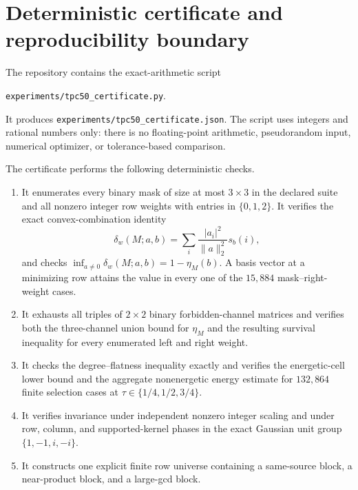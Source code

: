 \section{Deterministic certificate and reproducibility boundary}
\label{sec:tpc50-certificate}

The repository contains the exact-arithmetic script
\begin{center}
\texttt{experiments/tpc50\_certificate.py}.
\end{center}
It produces \texttt{experiments/tpc50\_certificate.json}.  The script
uses integers and rational numbers only: there is no floating-point
arithmetic, pseudorandom input, numerical optimizer, or tolerance-based
comparison.

The certificate performs the following deterministic checks.
\begin{enumerate}[label=\textup{(\roman*)},leftmargin=2.4em]
 \item It enumerates every binary mask of size at most
       \(3\times3\) in the declared suite and all nonzero integer row
       weights with entries in \(\{0,1,2\}\).  It verifies the exact
       convex-combination identity
       \begin{equation}
        \delta_w(M;a,b)
        =\sum_i\frac{|a_i|^2}{\|a\|_2^2}s_b(i),
        \label{eq:tpc50-certificate-convex-identity}
       \end{equation}
       and checks
       \(\inf_{a\ne0}\delta_w(M;a,b)=1-\eta_M(b)\).  A basis vector at
       a minimizing row attains the value in every one of the
       \(15{,}884\) mask--right-weight cases.
 \item It exhausts all triples of \(2\times2\) binary forbidden-channel
       matrices and verifies both the three-channel union bound for
       \(\eta_M\) and the resulting survival inequality for every
       enumerated left and right weight.
 \item It checks the degree--flatness inequality exactly and verifies
       the energetic-cell lower bound and the aggregate nonenergetic
       energy estimate for \(132{,}864\) finite selection cases at
       \(\tau\in\{1/4,1/2,3/4\}\).
 \item It verifies invariance under independent nonzero integer scaling
       and under row, column, and supported-kernel phases in the exact
       Gaussian unit group \(\{1,-1,i,-i\}\).
 \item It constructs one explicit finite row universe containing a
       same-source block, a near-product block, and a large-gcd block.

\end{enumerate}
